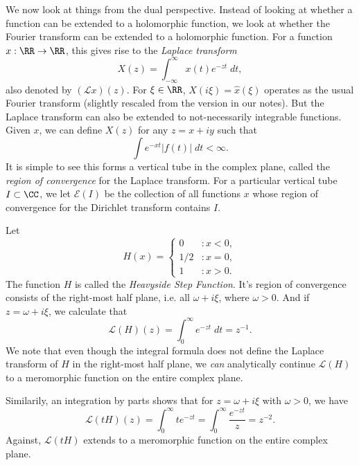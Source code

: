 We now look at things from the dual perspective. Instead of looking at whether a function can be extended to a holomorphic function, we look at whether the Fourier transform can be extended to a holomorphic function. For a function $x: \RR \to \RR$, this gives rise to the \emph{Laplace transform}
%
\[ X(z) = \int_{-\infty}^\infty x(t) e^{- z t}\; dt, \]
%
also denoted by $(\mathcal{L}x)(z)$. For $\xi \in \RR$, $X(i\xi) = \widehat{x}(\xi)$ operates as the usual Fourier transform (slightly rescaled from the version in our notes). But the Laplace transform can also be extended to not-necessarily integrable functions. Given $x$, we can define $X(z)$ for any $z = x + iy$ such that
%
\[ \int e^{-xt} |f(t)|\; dt < \infty. \]
%
It is simple to see this forms a vertical tube in the complex plane, called the \emph{region of convergence} for the Laplace transform. For a particular vertical tube $I \subset \CC$, we let $\mathcal{E}(I)$ be the collection of all functions $x$ whose region of convergence for the Dirichlet transform contains $I$.

\begin{example}
    Let
    \[ H(x) = \begin{cases} 0 &: x < 0, \\ 1/2 &: x = 0, \\ 1 &: x > 0. \end{cases} \]
    The function $H$ is called the \emph{Heavyside Step Function}. It's region of convergence consists of the right-most half plane, i.e. all $\omega + i\xi$, where $\omega > 0$. And if $z = \omega + i\xi$, we calculate that
    \[ \mathcal{L}(H)(z) = \int_0^\infty e^{- z t}\; dt = z^{-1}. \]
    We note that even though the integral formula does not define the Laplace transform of $H$ in the right-most half plane, we \emph{can} analytically continue $\mathcal{L}(H)$ to a meromorphic function on the entire complex plane.
\end{example}

\begin{example}
    Similarily, an integration by parts shows that for $z = \omega + i\xi$ with $\omega > 0$, we have
    \[ \mathcal{L}(tH)(z) = \int_0^\infty t e^{-zt} = \int_0^\infty \frac{e^{-zt}}{z} = z^{-2}. \]
    Against, $\mathcal{L}(tH)$ extends to a meromorphic function on the entire complex plane.
\end{example}

